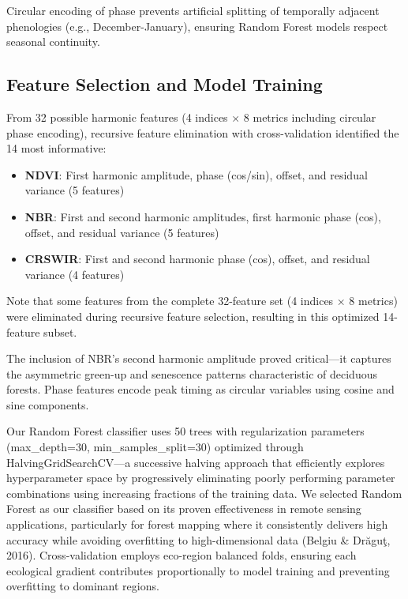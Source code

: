 \documentclass[utf8]{FrontiersinHarvard}
\begin{document}
Circular encoding of phase prevents artificial splitting of temporally adjacent phenologies (e.g., December-January), ensuring Random Forest models respect seasonal continuity.

\subsection{Feature Selection and Model Training}

From 32 possible harmonic features (4 indices × 8 metrics including circular phase encoding), recursive feature elimination with cross-validation identified the 14 most informative:

\begin{itemize}
    \item \textbf{NDVI}: First harmonic amplitude, phase (cos/sin), offset, and residual variance (5 features)
    \item \textbf{NBR}: First and second harmonic amplitudes, first harmonic phase (cos), offset, and residual variance (5 features)
    \item \textbf{CRSWIR}: First and second harmonic phase (cos), offset, and residual variance (4 features)
\end{itemize}

Note that some features from the complete 32-feature set (4 indices × 8 metrics) were eliminated during recursive feature selection, resulting in this optimized 14-feature subset.

The inclusion of NBR's second harmonic amplitude proved critical—it captures the asymmetric green-up and senescence patterns characteristic of deciduous forests. Phase features encode peak timing as circular variables using cosine and sine components.

Our Random Forest classifier uses 50 trees with regularization parameters (max\_depth=30, min\_samples\_split=30) optimized through HalvingGridSearchCV—a successive halving approach that efficiently explores hyperparameter space by progressively eliminating poorly performing parameter combinations using increasing fractions of the training data. We selected Random Forest as our classifier based on its proven effectiveness in remote sensing applications, particularly for forest mapping where it consistently delivers high accuracy while avoiding overfitting to high-dimensional data (Belgiu \& Drăguţ, 2016). Cross-validation employs eco-region balanced folds, ensuring each ecological gradient contributes proportionally to model training and preventing overfitting to dominant regions.
\end{document}
